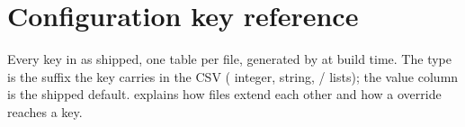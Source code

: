 \chapter{Configuration key reference}\label{app:config-keys}

Every key in  as shipped, one table per file, generated by
 at build time. The type is the suffix the key
carries in the CSV ( integer,  string, / lists); the
value column is the shipped default.  explains how files extend each
other and how a  override reaches a key.

\footnotesize

